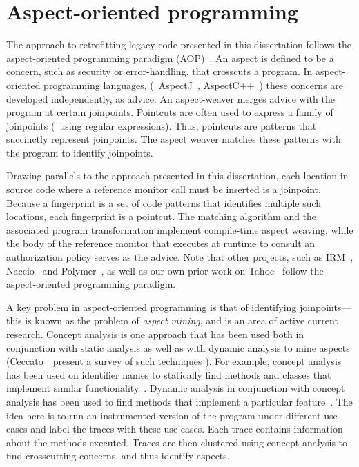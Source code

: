 \section{Aspect-oriented programming}
\label{chapter:relatedwork:aopl}

The approach to retrofitting legacy code presented in this dissertation follows
the aspect-oriented programming paradigm (AOP)~\cite{aosd, klm+97}. An aspect
is defined to be a concern, such as security or error-handling, that crosscuts
a program. In aspect-oriented programming languages,
(\eg~AspectJ~\cite{aspectj}, AspectC++~\cite{aspectc}) these concerns are
developed independently, as advice. An aspect-weaver merges advice with the
program at certain joinpoints. Pointcuts are often used to express a family of
joinpoints (\eg~using regular expressions). Thus, pointcuts are patterns that
succinctly represent joinpoints. The aspect weaver matches these patterns with
the program to identify joinpoints.

Drawing parallels to the approach presented in this dissertation, each location
in source code where a reference monitor call must be inserted is a joinpoint.
Because a fingerprint is a set of code patterns that identifies multiple such
locations, each fingerprint is a pointcut. The matching algorithm and the
associated program transformation implement compile-time aspect weaving, while
the body of the reference monitor that executes at runtime to consult an
authorization policy serves as the advice. Note that other projects, such as
IRM~\cite{e04}, Naccio~\cite{et99} and Polymer~\cite{blw05}, as well as our own
prior work on Tahoe~\cite{gjj05} follow the aspect-oriented programming
paradigm.

A key problem in aspect-oriented programming is that of identifying
joinpoints---this is known as the problem of \textit{aspect mining}, and is an
area of active current research. Concept analysis is one approach that has
been used both in conjunction with static analysis as well as with dynamic
analysis to mine aspects (Ceccato~\etal\ present a survey of such techniques
\cite{cmm+05}). For example, concept analysis has been used on identifier names
to statically find methods and classes that implement similar
functionality~\cite{tm04}. Dynamic analysis in conjunction with concept
analysis has been used to find methods that implement a particular
feature~\cite{eks03,tc04}. The idea here is to run an instrumented version of
the program under different use-cases and label the traces with these use
cases.  Each trace contains information about the methods executed. Traces are
then clustered using concept analysis to find crosscutting concerns, and thus
identify aspects. 

